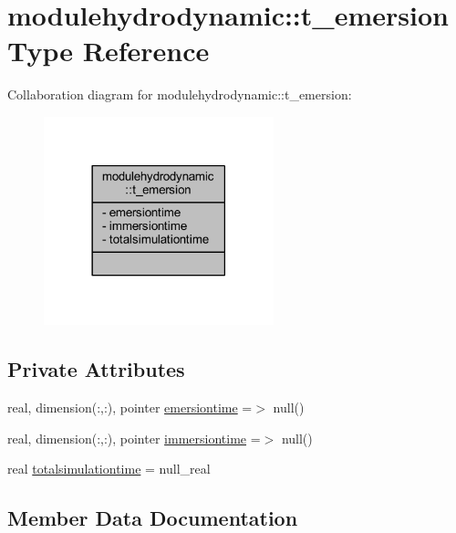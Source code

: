 \hypertarget{structmodulehydrodynamic_1_1t__emersion}{}\section{modulehydrodynamic\+:\+:t\+\_\+emersion Type Reference}
\label{structmodulehydrodynamic_1_1t__emersion}


Collaboration diagram for modulehydrodynamic\+:\+:t\+\_\+emersion\+:\nopagebreak
\begin{figure}[H]
\begin{center}
\leavevmode
\includegraphics[width=189pt]{structmodulehydrodynamic_1_1t__emersion__coll__graph}
\end{center}
\end{figure}
\subsection*{Private Attributes}
\begin{DoxyCompactItemize}
\item 
real, dimension(\+:,\+:), pointer \mbox{\hyperlink{structmodulehydrodynamic_1_1t__emersion_a80319c59e0b9cd80ae147bb60306edea}{emersiontime}} =$>$ null()
\item 
real, dimension(\+:,\+:), pointer \mbox{\hyperlink{structmodulehydrodynamic_1_1t__emersion_a695e419a1885a923d4ea62f548bab7c0}{immersiontime}} =$>$ null()
\item 
real \mbox{\hyperlink{structmodulehydrodynamic_1_1t__emersion_a821be53fb5eb77387595184fe250eaed}{totalsimulationtime}} = null\+\_\+real
\end{DoxyCompactItemize}


\subsection{Member Data Documentation}
\mbox{\label{structmodulehydrodynamic_1_1t__emersion_a80319c59e0b9cd80ae147bb60306edea}} 
